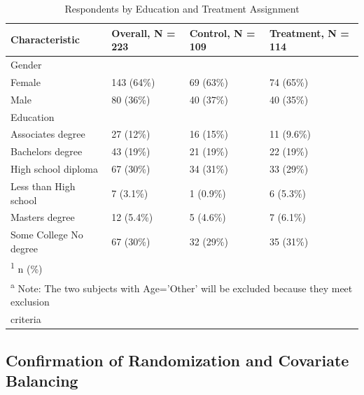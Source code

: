 \documentclass[
]{article}
\begin{document}
\begin{table}[H]

\caption{\label{tab:table1_2}Respondents by Education and Treatment Assignment}
\centering
\begin{tabular}[t]{l|l|l|l}
\hline
Characteristic & Overall, N = 223 & Control, N = 109 & Treatment, N = 114\\
\hline
Gender &  &  & \\
\hline
\hspace{1em}Female & 143 (64\%) & 69 (63\%) & 74 (65\%)\\
\hline
\hspace{1em}Male & 80 (36\%) & 40 (37\%) & 40 (35\%)\\
\hline
Education &  &  & \\
\hline
\hspace{1em}Associates degree & 27 (12\%) & 16 (15\%) & 11 (9.6\%)\\
\hline
\hspace{1em}Bachelors degree & 43 (19\%) & 21 (19\%) & 22 (19\%)\\
\hline
\hspace{1em}High school diploma & 67 (30\%) & 34 (31\%) & 33 (29\%)\\
\hline
\hspace{1em}Less than High school & 7 (3.1\%) & 1 (0.9\%) & 6 (5.3\%)\\
\hline
\hspace{1em}Masters degree & 12 (5.4\%) & 5 (4.6\%) & 7 (6.1\%)\\
\hline
\hspace{1em}Some College No degree & 67 (30\%) & 32 (29\%) & 35 (31\%)\\
\hline
\multicolumn{4}{l}{\rule{0pt}{1em}\textsuperscript{1} n (\%)}\\
\multicolumn{4}{l}{\textsuperscript{a} Note: The two subjects with Age='Other' will be excluded because they meet exclusion}\\
\multicolumn{4}{l}{criteria}\\
\end{tabular}
\end{table}

\hypertarget{confirmation-of-randomization-and-covariate-balancing}{%
\subsection{Confirmation of Randomization and Covariate
Balancing}\label{confirmation-of-randomization-and-covariate-balancing}}
\end{document}

